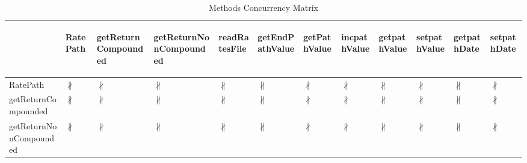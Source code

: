 \documentclass[10pt]{article}
\begin{document}
\begin{longtable}{|l|l|l|l|l|l|l|l|l|l|l|l|}
\caption{Methods Concurrency Matrix}\\
\hline
&\begin{sideways}RatePath\end{sideways}&\begin{sideways}getReturnCompounded\end{sideways}&\begin{sideways}getReturnNonCompounded\end{sideways}&\begin{sideways}readRatesFile\end{sideways}&\begin{sideways}getEndPathValue\end{sideways}&\begin{sideways}getPathValue\end{sideways}&\begin{sideways}incpathValue\end{sideways}&\begin{sideways}getpathValue\end{sideways}&\begin{sideways}setpathValue\end{sideways}&\begin{sideways}getpathDate\end{sideways}&\begin{sideways}setpathDate\end{sideways}\\
\hline
RatePath&{\color{BrickRed}$\nparallel$}&{\color{BrickRed}$\nparallel$}&{\color{BrickRed}$\nparallel$}&{\color{BrickRed}$\nparallel$}&{\color{BrickRed}$\nparallel$}&{\color{BrickRed}$\nparallel$}&{\color{BrickRed}$\nparallel$}&{\color{BrickRed}$\nparallel$}&{\color{BrickRed}$\nparallel$}&{\color{BrickRed}$\nparallel$}&{\color{BrickRed}$\nparallel$}\\
\hline
getReturnCompounded&{\color{BrickRed}$\nparallel$}&{\color{BrickRed}$\nparallel$}&{\color{BrickRed}$\nparallel$}&{\color{BrickRed}$\nparallel$}&{\color{BrickRed}$\nparallel$}&{\color{BrickRed}$\nparallel$}&{\color{BrickRed}$\nparallel$}&{\color{BrickRed}$\nparallel$}&{\color{BrickRed}$\nparallel$}&{\color{BrickRed}$\nparallel$}&{\color{BrickRed}$\nparallel$}\\
\hline
getReturnNonCompounded&{\color{BrickRed}$\nparallel$}&{\color{BrickRed}$\nparallel$}&{\color{BrickRed}$\nparallel$}&{\color{BrickRed}$\nparallel$}&{\color{BrickRed}$\nparallel$}&{\color{BrickRed}$\nparallel$}&{\color{BrickRed}$\nparallel$}&{\color{BrickRed}$\nparallel$}&{\color{BrickRed}$\nparallel$}&{\color{BrickRed}$\nparallel$}&{\color{BrickRed}$\nparallel$}\\

\end{longtable}
\end{document}
